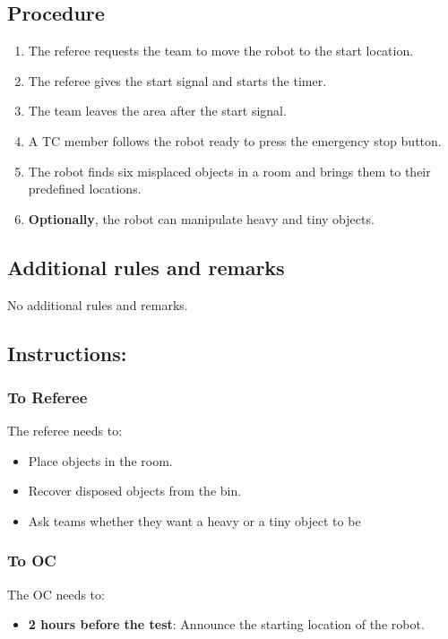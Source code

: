 \subsection*{Procedure}

\begin{enumerate}
	\item The referee requests the team to move the robot to the start location.
	\item The referee gives the start signal and starts the timer.
	\item The team leaves the area after the start signal.
	\item A TC member follows the robot ready to press the emergency stop button.
	\item The robot finds six misplaced objects in a room and brings them to their predefined locations.
	\item \textbf{Optionally}, the robot can manipulate heavy and tiny objects.
\end{enumerate}

\subsection*{Additional rules and remarks}
	No additional rules and remarks.

\subsection*{Instructions:}

\subsubsection*{To Referee}

The referee needs to:
\begin{itemize}
	\item Place objects in the room.
	\item Recover disposed objects from the bin.
	\item Ask teams whether they want a heavy or a tiny object to be 
\end{itemize}

\subsubsection*{To OC}
The OC needs to:
\begin{itemize}[nosep]
	\item \textbf{2 hours before the test}: Announce the starting location of the robot.
\end{itemize}

